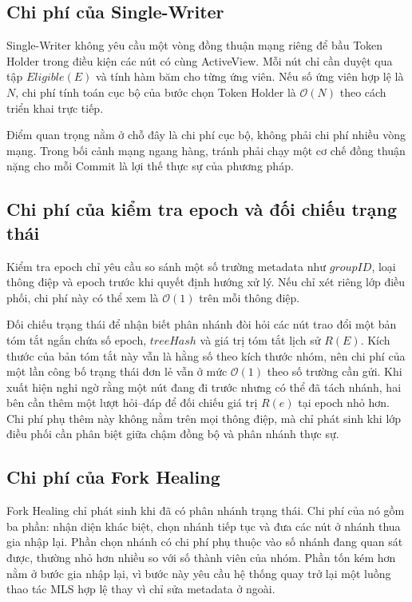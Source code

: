 \documentclass[../DoAn.tex]{subfiles}
\begin{document}
\subsection{Chi phí của Single-Writer}

Single-Writer không yêu cầu một vòng đồng thuận mạng riêng để bầu Token Holder trong điều kiện các nút có cùng ActiveView. Mỗi nút chỉ cần duyệt qua tập $Eligible(E)$ và tính hàm băm cho từng ứng viên. Nếu số ứng viên hợp lệ là $N$, chi phí tính toán cục bộ của bước chọn Token Holder là $\mathcal{O}(N)$ theo cách triển khai trực tiếp.

Điểm quan trọng nằm ở chỗ đây là chi phí cục bộ, không phải chi phí nhiều vòng mạng. Trong bối cảnh mạng ngang hàng, tránh phải chạy một cơ chế đồng thuận nặng cho mỗi Commit là lợi thế thực sự của phương pháp.

\subsection{Chi phí của kiểm tra epoch và đối chiếu trạng thái}

Kiểm tra epoch chỉ yêu cầu so sánh một số trường metadata như $groupID$, loại thông điệp và epoch trước khi quyết định hướng xử lý. Nếu chỉ xét riêng lớp điều phối, chi phí này có thể xem là $\mathcal{O}(1)$ trên mỗi thông điệp.

Đối chiếu trạng thái để nhận biết phân nhánh đòi hỏi các nút trao đổi một bản tóm tắt ngắn chứa số epoch, $treeHash$ và giá trị tóm tắt lịch sử $R(E)$. Kích thước của bản tóm tắt này vẫn là hằng số theo kích thước nhóm, nên chi phí của một lần công bố trạng thái đơn lẻ vẫn ở mức $\mathcal{O}(1)$ theo số trường cần gửi. Khi xuất hiện nghi ngờ rằng một nút đang đi trước nhưng có thể đã tách nhánh, hai bên cần thêm một lượt hỏi--đáp để đối chiếu giá trị $R(e)$ tại epoch nhỏ hơn. Chi phí phụ thêm này không nằm trên mọi thông điệp, mà chỉ phát sinh khi lớp điều phối cần phân biệt giữa chậm đồng bộ và phân nhánh thực sự.

\subsection{Chi phí của Fork Healing}

Fork Healing chỉ phát sinh khi đã có phân nhánh trạng thái. Chi phí của nó gồm ba phần: nhận diện khác biệt, chọn nhánh tiếp tục và đưa các nút ở nhánh thua gia nhập lại. Phần chọn nhánh có chi phí phụ thuộc vào số nhánh đang quan sát được, thường nhỏ hơn nhiều so với số thành viên của nhóm. Phần tốn kém hơn nằm ở bước gia nhập lại, vì bước này yêu cầu hệ thống quay trở lại một luồng thao tác MLS hợp lệ thay vì chỉ sửa metadata ở ngoài.
\end{document}
